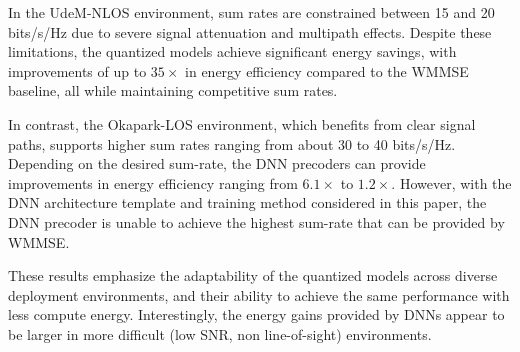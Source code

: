 In the UdeM-NLOS environment, sum rates are constrained between 15 and 20 bits/s/Hz due to severe signal attenuation and multipath effects. Despite these limitations, the quantized models achieve significant energy savings, with improvements of up to $35\times$ in energy efficiency compared to the WMMSE baseline, all while maintaining competitive sum rates.

In contrast, the Okapark-LOS environment, which benefits from clear signal paths, supports higher sum rates ranging from about 30 to 40 bits/s/Hz. 
Depending on the desired sum-rate, the DNN precoders can provide improvements in energy efficiency ranging from $6.1\times$ to $1.2\times$. However, with the DNN architecture template and training method considered in this paper, the DNN precoder is unable to achieve the highest sum-rate that can be provided by WMMSE.

These results emphasize the adaptability of the quantized models across diverse deployment environments, and their ability to achieve the same performance with less compute energy. Interestingly, the energy gains provided by DNNs appear to be larger in more difficult (low SNR, non line-of-sight) environments.




